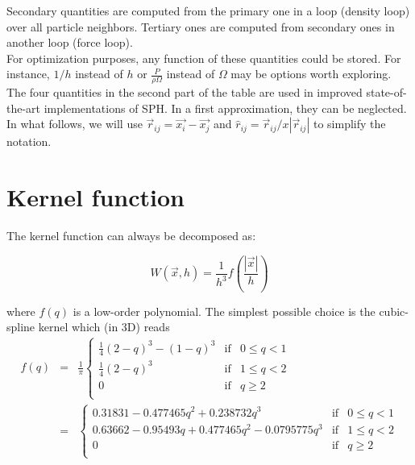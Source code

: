 \documentclass[a4paper,10pt]{article}
\begin{document}
Secondary quantities are computed from the primary one in a loop (density loop) over all particle neighbors. Tertiary
ones are computed from secondary ones in another loop (force loop). \\

For optimization purposes, any function of these quantities could be stored. For instance, $1/h$ instead of $h$ or
$\frac{P}{\rho\Omega}$ instead of $\Omega$ may be options worth exploring. \\

The four quantities in the second part of the table are used in improved state-of-the-art implementations of SPH. In a
first approximation, they can be neglected. \\

In what follows, we will use $\vec{r}_{ij} = \vec{x_i} - \vec{x_j}$ and $\hat{r}_{ij} = \vec{r}_{ij}/x|\vec{r}_{ij}|$
to simplify the notation.

\section{Kernel function}

The kernel function can always be decomposed as:

\begin{equation}
 W(\vec{x}, h) = \frac{1}{h^3}f\left(\frac{|\vec{x}|}{h}\right) 
\end{equation}

where $f(q)$ is a low-order polynomial. The simplest possible choice is the cubic-spline kernel which (in 3D) reads
\begin{eqnarray*}
 f(q) &=& \frac{1}{\pi}\left\lbrace \begin{array}{rcl}
                      \frac{1}{4}(2-q)^3 - (1-q)^3 & \mbox{if} & 0 \leq q < 1 \\
		      \frac{1}{4}(2-q)^3 & \mbox{if} & 1 \leq q < 2 \\
		      0 & \mbox{if} & q \geq 2 \\
                     \end{array}
 \right. \\
&=&\left\lbrace \begin{array}{rcl}
    0.31831 -0.477465 q^2+0.238732 q^3& \mbox{if} & 0 \leq q < 1 \\
   0.63662 -0.95493 q+0.477465 q^2-0.0795775 q^3  & \mbox{if} & 1 \leq q < 2 \\
		      0 & \mbox{if} & q \geq 2 \\
                     \end{array}
 \right.
\end{eqnarray*}
\end{document}
